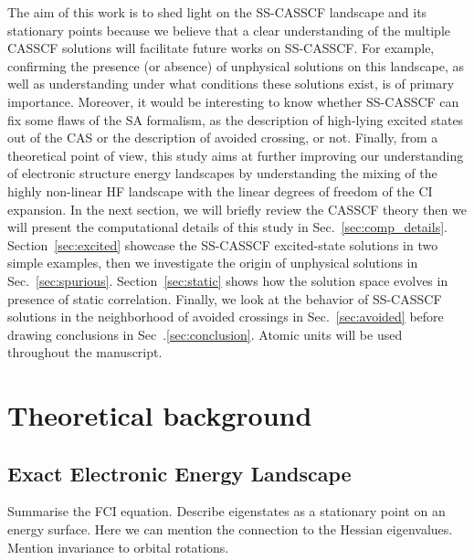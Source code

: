 \documentclass[aip,jcp,reprint,noshowkeys,superscriptaddress]{revtex4-1}
\newcommand{\hugh}[1]{\textcolor{hughgreen}{#1}}
\begin{document}
The aim of this work is to shed light on the SS-CASSCF landscape and its stationary points because we believe that a clear understanding of the multiple CASSCF solutions will facilitate future works on SS-CASSCF.
For example, confirming the presence (or absence) of unphysical solutions on this landscape, as well as understanding under what conditions these solutions exist, is of primary importance.
Moreover, it would be interesting to know whether SS-CASSCF can fix some flaws of the SA formalism, as the description of high-lying excited states out of the CAS or the description of avoided crossing, or not.
Finally, from a theoretical point of view, this study aims at further improving our understanding of electronic structure energy landscapes by understanding the mixing of the highly non-linear HF landscape with the linear degrees of freedom of the CI expansion.
In the next section, we will briefly review the CASSCF theory then we will present the computational details of this study in Sec.~\ref{sec:comp_details}.
Section~\ref{sec:excited} showcase the SS-CASSCF excited-state solutions in two simple examples, then we investigate the origin of unphysical solutions in Sec.~\ref{sec:spurious}.
Section~\ref{sec:static} shows how the solution space evolves in presence of static correlation.
Finally, we look at the behavior of SS-CASSCF solutions in the neighborhood of avoided crossings in Sec.~\ref{sec:avoided} before drawing conclusions in Sec~.\ref{sec:conclusion}.
Atomic units will be used throughout the manuscript.

\section{Theoretical background}
\label{sec:theoretical}

\subsection{Exact Electronic Energy Landscape}
\label{subsec:exactLandscape}
\hugh{Summarise the FCI equation. Describe eigenstates as a stationary point on an energy surface. 
Here we can mention the connection to the Hessian eigenvalues. Mention invariance to orbital rotations.}
\end{document}
